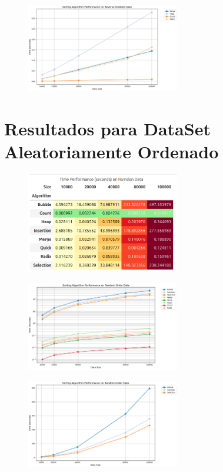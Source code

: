 \begin{figure}[H]
  \centering
  \includegraphics[width=0.6\textwidth]{images/o_inv}
\end{figure}

\section{Resultados para DataSet Aleatoriamente Ordenado}
\begin{figure}[H]
  \centering
  \includegraphics[width=0.6\textwidth]{images/random_table}
\end{figure}

\begin{figure}[H]
  \centering
  \includegraphics[width=0.6\textwidth]{images/all_algo_rand}
\end{figure}

\begin{figure}[H]
  \centering
  \includegraphics[width=0.6\textwidth]{images/o2_random}
\end{figure}

